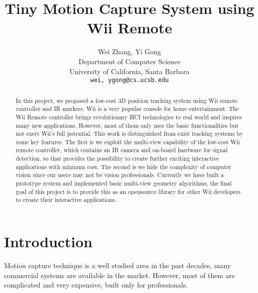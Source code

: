 \documentclass[10pt,twocolumn,letterpaper]{article}
\begin{document}
\title{Tiny Motion Capture System using Wii Remote}

\author{Wei Zhang, Yi Gong\\
Department of Computer Science\\
University of California, Santa Barbara\\
{\tt\small wei, ygong@cs.ucsb.edu}\\
}

\maketitle
\thispagestyle{empty}

\begin{abstract}
In this project, we proposed a low-cost 3D position tracking system using 
Wii remote controller and IR markers. 
Wii is a very popular console for home entertainment. 
The Wii Remote controller brings revolutionary HCI technologies
to real world and inspires many new applications. However, most of
them only uses the basic functionalities but not exert Wii's full potential.
This work is distinguished from exist
tracking systems by some key features. The first is we exploit the 
multi-view capability of the low-cost Wii remote controller, 
which contains an IR camera and on-board
hardware for signal detection, so that provides the possibility to create
further exciting interactive applications with mininum cost. 
The second is we hide the complexity of computer vision 
since our users may not be vision professionals. 
Currently we have built 
a prototype system and implemented basic multi-view geometry algorithms, 
the final goal of this project is to provide this as an opensource library for other 
Wii developers to create their interactive applications.
\end{abstract}

\section{Introduction}
Motion capture technique is a well studied area in the past decades, 
many commercial systems are available in the market. However, most of them 
are complicated and very expensive, built only for professionals.
\end{document}
